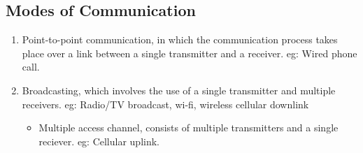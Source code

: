 \documentclass{article}
\begin{document}
\subsection{Modes of Communication}
\begin{enumerate}
    \item Point-to-point communication, in which the communication process takes place over a link between a single transmitter and a receiver. eg: Wired phone call.
    \item Broadcasting, which involves the use of a single  transmitter and multiple receivers. eg: Radio/TV broadcast, wi-fi, wireless cellular downlink
    \begin{itemize}
        \item Multiple access channel, consists of multiple transmitters and a single reciever. eg: Cellular uplink.
    \end{itemize}
\end{enumerate}
\end{document}
